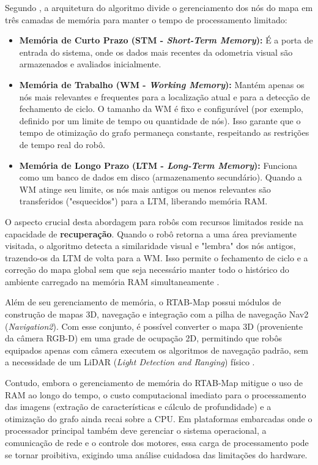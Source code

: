Segundo , a arquitetura do algoritmo divide o gerenciamento dos nós do mapa em três camadas de memória para manter o tempo de processamento limitado:

\begin{itemize}
    \item \textbf{Memória de Curto Prazo (STM - \textit{Short-Term Memory}):} É a porta de entrada do sistema, onde os dados mais recentes da odometria visual são armazenados e avaliados inicialmente.
    
    \item \textbf{Memória de Trabalho (WM - \textit{Working Memory}):} Mantém apenas os nós mais relevantes e frequentes para a localização atual e para a detecção de fechamento de ciclo. O tamanho da WM é fixo e configurável (por exemplo, definido por um limite de tempo ou quantidade de nós). Isso garante que o tempo de otimização do grafo permaneça constante, respeitando as restrições de tempo real do robô.
    
    \item \textbf{Memória de Longo Prazo (LTM - \textit{Long-Term Memory}):} Funciona como um banco de dados em disco (armazenamento secundário). Quando a WM atinge seu limite, os nós mais antigos ou menos relevantes são transferidos ("esquecidos") para a LTM, liberando memória RAM.
\end{itemize}

O aspecto crucial desta abordagem para robôs com recursos limitados reside na capacidade de \textbf{recuperação}. Quando o robô retorna a uma área previamente visitada, o algoritmo detecta a similaridade visual e "lembra" dos nós antigos, trazendo-os da LTM de volta para a WM. Isso permite o fechamento de ciclo e a correção do mapa global sem que seja necessário manter todo o histórico do ambiente carregado na memória RAM simultaneamente \cite{labbé2019rtabmapopensourcelidar}.

Além de seu gerenciamento de memória, o RTAB-Map possui módulos de construção de mapas 3D, navegação e integração com a pilha de navegação Nav2 (\textit{Navigation2}). Com esse conjunto, é possível converter o mapa 3D (proveniente da câmera RGB-D) em uma grade de ocupação 2D, permitindo que robôs equipados apenas com câmera executem os algoritmos de navegação padrão, sem a necessidade de um LiDAR (\textit{Light Detection and Ranging}) físico \cite{labbé2019rtabmapopensourcelidar}.

Contudo, embora o gerenciamento de memória do RTAB-Map mitigue o uso de RAM ao longo do tempo, o custo computacional imediato para o processamento das imagens (extração de características e cálculo de profundidade) e a otimização do grafo ainda recai sobre a CPU. Em plataformas embarcadas onde o processador principal também deve gerenciar o sistema operacional, a comunicação de rede e o controle dos motores, essa carga de processamento pode se tornar proibitiva, exigindo uma análise cuidadosa das limitações do hardware.

